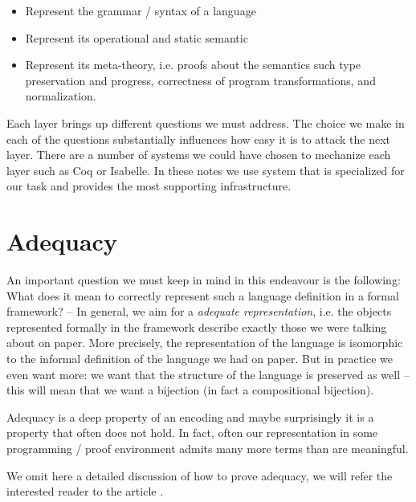 \begin{itemize}
\item Represent the grammar / syntax of a language
\item Represent its operational and static semantic
\item Represent its meta-theory, i.e. proofs about the semantics such
  type preservation and progress, correctness of program transformations, and normalization.
\end{itemize}

Each layer brings up different questions we must address. The choice
we make in each of the questions substantially influences how easy it
is to attack the next layer.  There are a number of systems we could have chosen to mechanize each layer such as Coq or Isabelle. In these notes we use system that is specialized for our task and provides the most supporting infrastructure. 
 

\section{Adequacy} An important question we must keep in mind in
this endeavour is the following: 
What does it mean to correctly represent such a language
definition in a formal framework? -- In general, we aim for a
\emph{adequate representation}, i.e. the objects represented formally
in the framework describe exactly those we were talking about on
paper. More precisely, the representation of the language is
isomorphic to the informal definition of the language we had on
paper. But in practice we even want more: we want that the structure
of the language is preserved as well -- this will mean that we want a
bijection (in fact a compositional bijection).


Adequacy is a deep property of an encoding and maybe surprisingly it
is a property that often does not hold. In fact, often our
representation in some programming / proof environment admits many
more terms than are meaningful. 

We omit here a detailed discussion of how to prove adequacy, we
will refer the interested reader to the article
\citep{HarperLicata:JFP07}. 
